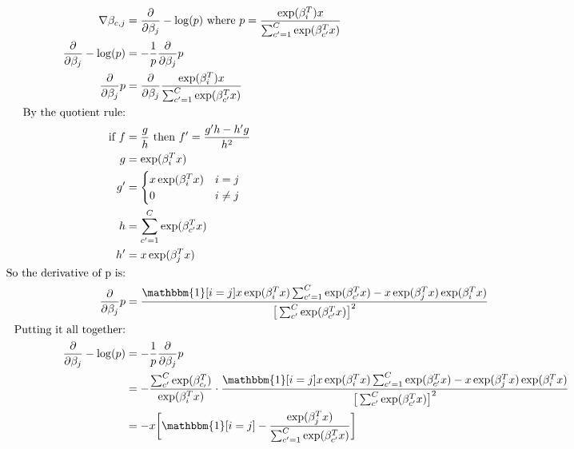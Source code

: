 \documentclass[11pt]{article}
\begin{document}
\begin{align*}
	\nabla \beta_{c,j} &= \frac{\partial}{\partial \beta_{j}} -\log(p) \text{   where } p=\frac{\exp(\beta_{i}^{T})x}{\sum_{c^{\prime}=1}^{C}\exp(\beta_{c^{\prime}}^{T}x)}\\
	\frac{\partial}{\partial \beta_{j}} -\log(p) &= -\frac{1}{p} \frac{\partial}{\partial \beta_{j}}p\\
	\frac{\partial}{\partial \beta_{j}}p &= \frac{\partial}{\partial \beta_{j}} \frac{\exp(\beta_{i}^{T})x}{\sum_{c^{\prime}=1}^{C}\exp(\beta_{c^{\prime}}^{T}x)}\\
	\text{By the quotient rule:}&\\
	\text{if  }f &= \frac{g}{h} \text{  then  }f^{\prime}=\frac{g^{\prime}h-h^{\prime}g}{h^{2}}\\
	g &= \exp(\beta_{i}^{T}x)\\
	g^{\prime} &= 
		\begin{cases}
			x\exp(\beta_{i}^{T}x) & i = j\\
	 		0 & i \neq j
	 	\end{cases}
	\\
	h &= \sum_{c^{\prime}=1}^{C}\exp(\beta_{c^{\prime}}^{T}x)\\
	h^{\prime} &= x\exp(\beta_{j}^{T}x)\\
	\text{So the derivative of p is:}&\\
	\frac{\partial}{\partial \beta_{j}}p &= \frac{\mathbbm{1}[i=j]x \exp(\beta_{i}^{T}x)\sum_{c^{\prime}=1}^{C} \exp(\beta_{c^{\prime}}^{T}x)-x \exp(\beta_{j}^{T}x) \exp(\beta_{i}^{T}x)}{\big[\sum_{c^{\prime}}^{C} \exp(\beta_{c^{\prime}}^{T}x)\big]^{2}}\\
	\text{Putting it all together:}&\\
	\frac{\partial}{\partial \beta_{j}} -\log(p)&=-\frac{1}{p}\frac{\partial}{\partial \beta_{j}}p\\
	&= -\frac{\sum_{c^{\prime}}^{C} \exp(\beta_{c_{\prime}}^{T})}{\exp(\beta_{i}^{T}x)} \cdot \frac{\mathbbm{1}[i=j]x \exp(\beta_{i}^{T}x)\sum_{c^{\prime}=1}^{C} \exp(\beta_{c^{\prime}}^{T}x)-x \exp(\beta_{j}^{T}x) \exp(\beta_{i}^{T}x)}{\big[\sum_{c^{\prime}}^{C} \exp(\beta_{c^{\prime}}^{T}x)\big]^{2}}\\
	&= -x \bigg[\mathbbm{1}[i=j]-\frac{\exp(\beta_{j}^{T}x)}{\sum_{c^{\prime}=1}^{C} \exp(\beta_{c^{\prime}}^{T}x)} \bigg]\\
\end{align*}
\end{document}
